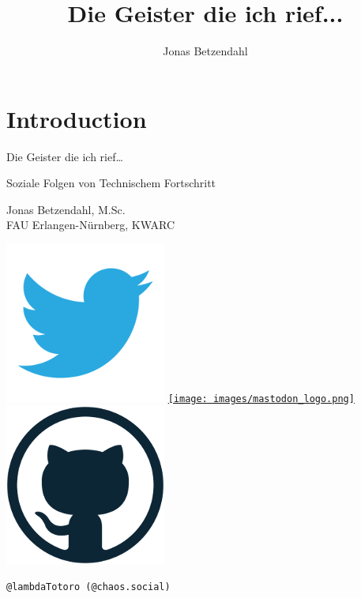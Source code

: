 \documentclass[aspectratio=169,usenames,dvipsnames]{beamer}
\author{Jonas Betzendahl}
\title{Die Geister die ich rief...}
\begin{document}
\section{Introduction}

\begin{frame}
\begin{center}
\vfill
\huge Die Geister die ich rief\dots
\normalsize 
\smallskip
\smallskip

Soziale Folgen von Technischem Fortschritt
\bigskip\bigskip

\large Jonas Betzendahl, M.Sc.\\\normalsize FAU Erlangen-Nürnberg, KWARC
\bigskip\bigskip\large

\href{https://twitter.com/lambdatotoro}{\includegraphics[scale=0.125]{images/twitter_logo.png}}
\href{https://chaos.social/@lambdatotoro}{\texttt{[image: images/mastodon\_logo.png]}}
\href{https://github.com/lambdaTotoro}{\includegraphics[scale=0.125]{images/github_logo.png}}

\texttt{@lambdaTotoro (@chaos.social)}
\end{center}
\end{frame}

\end{document}
